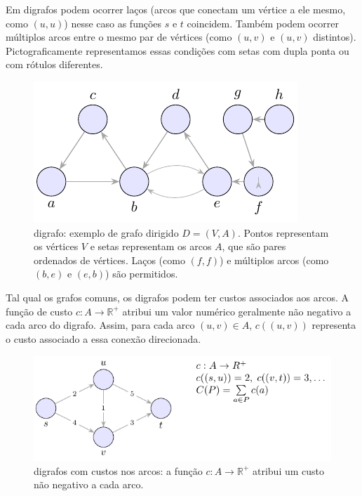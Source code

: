 Em digrafos podem ocorrer laços (arcos que conectam um vértice a ele mesmo, como \((u, u)\)) nesse caso as funções \(s\) e \(t\) coincidem. Também podem ocorrer múltiplos arcos entre o mesmo par de vértices (como \((u, v)\) e \((u, v)\) distintos). Pictograficamente representamos essas condições com setas com dupla ponta ou com rótulos diferentes.


\begin{figure}[H]
	\centering
	\includegraphics[width=0.9\linewidth]{figures/fig_def_digrafo_simples.pdf}

	\caption{digrafo: exemplo de grafo dirigido \(D=(V,A)\). Pontos representam os vértices \(V\) e setas representam os arcos \(A\), que são pares ordenados de vértices. Laços (como \((f,f)\)) e múltiplos arcos (como \((b,e)\) e \((e,b)\)) são permitidos.}
	\label{fig:def-digrafo-simples}\end{figure}



Tal qual os grafos comuns, os digrafos podem ter custos associados aos arcos. A função de custo \(c: A \to \mathbb{R}^+\) atribui um valor numérico geralmente não negativo a cada arco do digrafo. Assim, para cada arco \((u, v) \in A\), \(c((u, v))\) representa o custo associado a essa conexão direcionada.


\begin{figure}[H]
	\centering
	\includegraphics[width=0.9\linewidth]{figures/fig_digrafo_custos.pdf}

	\caption{digrafos com custos nos arcos: a função $c:A\to\mathbb{R}^+$ atribui um custo não negativo a cada arco.}
	\label{fig:digrafo-custos}
\end{figure}



